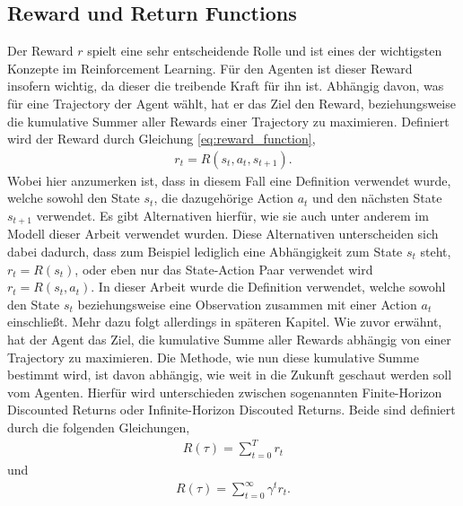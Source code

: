 \documentclass[]{iat}
\begin{document}
\subsection{Reward und Return Functions} \label{sec:reward}
Der Reward $r$ spielt eine sehr entscheidende Rolle und ist eines der wichtigsten Konzepte im Reinforcement Learning. Für den Agenten ist dieser Reward insofern wichtig, da dieser die treibende Kraft für ihn ist. Abhängig davon, was für eine Trajectory der Agent wählt, hat er das Ziel den Reward, beziehungsweise die kumulative Summer aller Rewards einer Trajectory zu maximieren. Definiert wird der Reward durch Gleichung \ref{eq:reward_function},
\begin{align}
    r_t = R(s_t, a_t, s_{t+1}) \label{eq:reward_function}.
\end{align}
Wobei hier anzumerken ist, dass in diesem Fall eine Definition verwendet wurde, welche sowohl den State $s_t$, die dazugehörige Action $a_t$ und den nächsten State $s_{t+1}$ verwendet. Es gibt Alternativen hierfür, wie sie auch unter anderem im Modell dieser Arbeit verwendet wurden. Diese Alternativen unterscheiden sich dabei dadurch, dass zum Beispiel lediglich eine Abhängigkeit zum State $s_t$ steht, $r_t = R(s_t)$, oder eben nur das State-Action Paar verwendet wird $r_t = R(s_t, a_t)$. In dieser Arbeit wurde die Definition verwendet, welche sowohl den State $s_t$ beziehungsweise eine Observation zusammen mit einer Action $a_t$ einschließt. Mehr dazu folgt allerdings in späteren Kapitel. Wie zuvor erwähnt, hat der Agent das Ziel, die kumulative Summe aller Rewards abhängig von einer Trajectory zu maximieren. Die Methode, wie nun diese kumulative Summe bestimmt wird, ist davon abhängig, wie weit in die Zukunft geschaut werden soll vom Agenten. Hierfür wird unterschieden zwischen sogenannten Finite-Horizon Discounted Returns oder Infinite-Horizon Discouted Returns. Beide sind definiert durch die folgenden Gleichungen,
\begin{align}
    R(\tau) = \sum_{t = 0}^{T} r_t \label{eq:finite_horizon_undiscounted}
\end{align}
und
\begin{align}
    R(\tau) = \sum_{t = 0}^{\infty} \gamma^t r_t. \label{eq:infinite_horizon_discounted}
\end{align}
\end{document}
